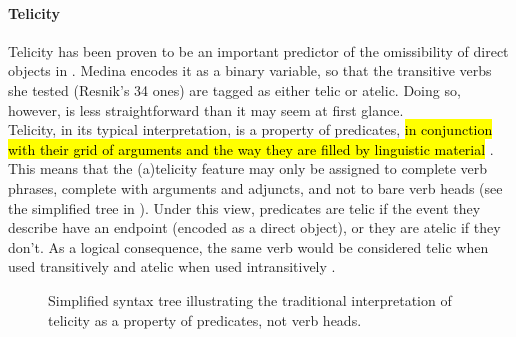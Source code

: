 \paragraph{Telicity} Telicity has been proven to be an important predictor of the omissibility of direct objects in . Medina encodes it as a binary variable, so that the transitive verbs she tested (Resnik's 34 ones) are tagged as either telic or atelic. Doing so, however, is less straightforward than it may seem at first glance.\\
Telicity, in its typical interpretation, is a property of predicates, \hl{in conjunction with their grid of arguments and the way they are filled by linguistic material} \parencite{Vendler1957, dowty2012word1979}. This means that the (a)telicity feature may only be assigned to complete verb phrases, complete with arguments and adjuncts, and not to bare verb heads (see the simplified tree in ). Under this view, predicates are telic if the event they describe have an endpoint (encoded as a direct object), or they are atelic if they don't. As a logical consequence, the same verb would be considered telic when used transitively and atelic when used intransitively \parencite{OlsenResnik1997, Mittwoch1982}.

\begin{figure}[htb]
\caption{Simplified syntax tree illustrating the traditional interpretation of telicity as a property of predicates, not verb heads.}
\end{figure}


